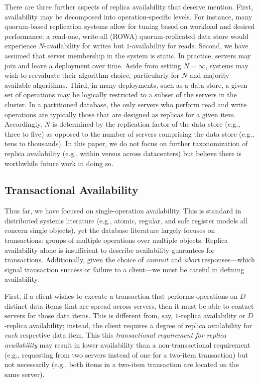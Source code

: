 There are three further aspects of replica availability that deserve
mention. First, availability may be decomposed into operation-specific
levels. For instance, many quorum-based replication systems allow for
tuning based on workload and desired performance; a read-one,
write-all (ROWA) quorum-replicated data store would experience
$N$-availability for writes but $1$-availability for reads. Second, we
have assumed that server membership in the system is static. In
practice, servers may join and leave a deployment over time. Aside
from setting $N=\infty$, systems may wish to reevaluate their
algorithm choice, particularly for $N$ and majority available
algorithms. Third, in many deployments, such as a data store, a given
set of operations may be logically restricted to a subset of the
servers in the cluster. In a partitioned database, the only servers
who perform read and write operations are typically those that are
designed as replicas for a given item. Accordingly, $N$ is determined
by the replication factor of the data store (e.g., three to five) as
opposed to the number of servers comprising the data store (e.g., tens
to thousands). In this paper, we do not focus on further
taxonomization of replica availability (e.g., within versus across
datacenters) but believe there is worthwhile future work in doing so.

\subsection{Transactional Availability}

Thus far, we have focused on single-operation availability. This is
standard in distributed systems literature (e.g., atomic, regular, and
safe register models all concern single objects), yet the database
literature largely focuses on transactions: groups of multiple
operations over multiple objects. Replica availability alone is
insufficient to describe availability guarantees for
transactions. Additionally, given the choice of \textit{commit} and
\textit{abort} responses---which signal transaction success or failure
to a client---we must be careful in defining availability.

First, if a client wishes to execute a transaction that performs
operations on $D$ distinct data items that are spread across servers,
then it must be able to contact servers for those data items. This is
different from, say, $1$-replica availability or $D$-replica
availability; instead, the client requires a degree of replica
availability for \textit{each} respective data item. This this
\textit{transactional requirement for replica availability} may result
in lower availability than a non-transactional requirement (e.g.,
requesting from two servers instead of one for a two-item transaction)
but not necessarily (e.g., both items in a two-item transaction are
located on the same server).

